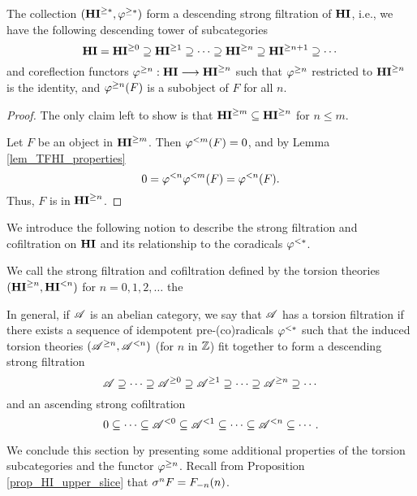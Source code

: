 \begin{prop}\label{prop_THI_form_strong_filt}
The collection $(\THI{*}, \tgHI{*})$ form a descending strong 
filtration of $\HI$, i.e., we have the following descending
tower of subcategories
\[
\HI = \THI{0} \supseteq \THI{1} \supseteq \cdots \supseteq \THI{n} \supseteq \THI{n + 1}
\supseteq \cdots
\]
and coreflection functors $\tgHI{n} : \HI \to \THI{n}$ such
that $\tgHI{n}$ restricted to $\THI{n}$ is the identity, and
$\tgHI{n}(F)$ is a subobject of $F$ for all $n$.
\end{prop}
\begin{proof}
The only claim left to show is that $\THI{m} \subseteq \THI{n}$
for $n \leq m$.

Let $F$ be an object in $\THI{m}$. Then 
$\tlHI{m}(F) = 0$, and by Lemma \ref{lem_TFHI_properties}
\[
0 = \tlHI{n}\tlHI{m}(F) = \tlHI{n}(F).
\]
Thus, $F$ is in $\THI{n}$.
\end{proof}

We introduce the following notion to describe the strong filtration
and cofiltration on $\HI$ and its relationship to the coradicals
$\tlHI{*}$.

\begin{defn}
We call the strong filtration and cofiltration defined by
the torsion theories $(\TGHI{n}{\HI}, \TLHI{n}{\HI})$ for $n = 
0,1,2,\dots$ the 

In general, if $\Cat{A}$ is an abelian category, we say that
$\Cat{A}$ has a torsion filtration if there exists a sequence
of idempotent pre-(co)radicals $\corad{*}$ such that the induced
torsion theories $(\Prerad{n}{\Cat{A}}, \Corad{n}{\Cat{A}})$ (for 
$n$ in $\Z$) fit together to form a descending strong filtration
\[
\Cat{A} \supseteq \cdots \supseteq \Prerad{0}{\Cat{A}} \supseteq
   \Prerad{1}{\Cat{A}} \supseteq \cdots \supseteq \Prerad{n}{\Cat{A}}
   \supseteq \cdots
\]
and an ascending strong cofiltration
\[
0 \subseteq \cdots \subseteq \Corad{0}{\Cat{A}} \subseteq
   \Corad{1}{\Cat{A}} \subseteq \cdots \subseteq \Corad{n}{\Cat{A}}
   \subseteq \cdots.
\]
\end{defn}

We conclude this section by presenting some additional properties of
the torsion subcategories and the functor $\tgHI{n}$. Recall from
Proposition \ref{prop_HI_upper_slice} that $\sgHI{n}F = 
\LHI[n]{\RHI[n]{F}}$.

